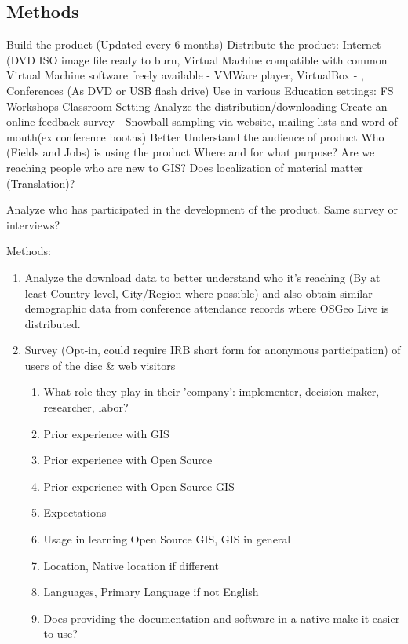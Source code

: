\documentclass[12pt,letterpaper]{article}
\begin{document}
\subsection{Methods}
Build the product (Updated every 6 months)
Distribute the product: Internet (DVD ISO image file ready to burn, Virtual Machine compatible with common Virtual Machine software freely available - VMWare player, VirtualBox - , Conferences (As DVD or USB flash drive)
Use in various Education settings:
	FS Workshops
	Classroom Setting
Analyze the distribution/downloading 
Create an online feedback survey - Snowball sampling via website, mailing lists and word of mouth(ex conference booths)
	Better Understand the audience of product
	Who (Fields and Jobs) is using the product Where and for what purpose?
	Are we reaching people who are new to GIS?
	Does localization of material matter (Translation)?	
	
Analyze who has participated in the development of the product. Same survey or interviews?	
	
Methods:
\begin{enumerate}
\item Analyze the download data to better understand who it's reaching (By at least Country level, City/Region where possible) and also obtain similar demographic data from conference attendance records where OSGeo Live is distributed.
\item Survey (Opt-in, could require IRB short form for anonymous participation) of users of the disc \& web visitors
	\begin{enumerate}
		\item What role they play in their 'company': implementer, decision maker, researcher, labor?
		\item Prior experience with GIS
		\item Prior experience with Open Source
		\item Prior experience with Open Source GIS
		\item Expectations
		\item Usage in learning Open Source GIS, GIS in general
		\item Location, Native location if different
		\item Languages, Primary Language if not English
		\item Does providing the documentation and software in a native make it easier to use?
	\end{enumerate}
\end{enumerate}
\end{document}
